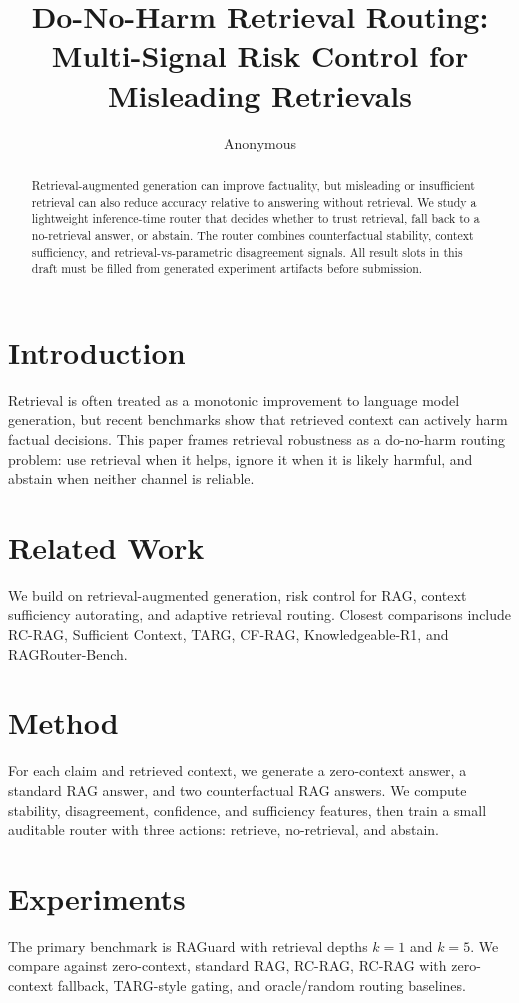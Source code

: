 \documentclass[11pt]{article}
\title{Do-No-Harm Retrieval Routing: Multi-Signal Risk Control for Misleading Retrievals}
\author{Anonymous}
\date{}
\begin{document}
\maketitle

\begin{abstract}
Retrieval-augmented generation can improve factuality, but misleading or insufficient retrieval can also reduce accuracy relative to answering without retrieval.
We study a lightweight inference-time router that decides whether to trust retrieval, fall back to a no-retrieval answer, or abstain.
The router combines counterfactual stability, context sufficiency, and retrieval-vs-parametric disagreement signals.
All result slots in this draft must be filled from generated experiment artifacts before submission.
\end{abstract}

\section{Introduction}
Retrieval is often treated as a monotonic improvement to language model generation, but recent benchmarks show that retrieved context can actively harm factual decisions.
This paper frames retrieval robustness as a do-no-harm routing problem: use retrieval when it helps, ignore it when it is likely harmful, and abstain when neither channel is reliable.

\section{Related Work}
We build on retrieval-augmented generation, risk control for RAG, context sufficiency autorating, and adaptive retrieval routing.
Closest comparisons include RC-RAG, Sufficient Context, TARG, CF-RAG, Knowledgeable-R1, and RAGRouter-Bench.

\section{Method}
For each claim and retrieved context, we generate a zero-context answer, a standard RAG answer, and two counterfactual RAG answers.
We compute stability, disagreement, confidence, and sufficiency features, then train a small auditable router with three actions: retrieve, no-retrieval, and abstain.

\section{Experiments}
The primary benchmark is RAGuard with retrieval depths $k=1$ and $k=5$.
We compare against zero-context, standard RAG, RC-RAG, RC-RAG with zero-context fallback, TARG-style gating, and oracle/random routing baselines.
\end{document}
